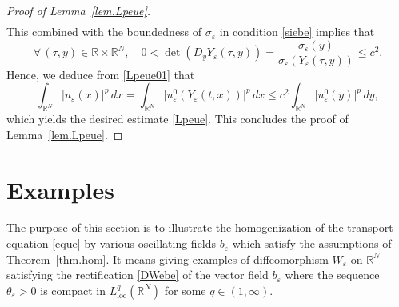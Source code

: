 \documentclass[11pt]{article}
\newcommand{\loc}{\mathrm{loc}}
\def \RR {\mathbb R}
\theoremstyle{plain}
\theoremstyle{definition}
\numberwithin{equation}{section}
\begin{document}
\begin{proof}[Proof of Lemma~\ref{lem.Lpeue}]
\begin{multline*}
\end{multline*}
This combined with the boundedness of $\sigma_\varepsilon$ in condition \eqref{siebe} implies that
\[
\forall\,(\tau,y)\in\RR\times\RR^N,\quad 0<\det(D_y Y_\varepsilon(\tau,y))= \dfrac{\sigma_\varepsilon(y)}{\sigma_\varepsilon(Y_\varepsilon(\tau,y))}\leq c^2.
\]
Hence, we deduce from \eqref{Lpeue01} that
\[
\int_{\RR^N}|u_\varepsilon(x)|^p\,dx=\int_{\RR^N}\big|u_\varepsilon^0(Y_\varepsilon(t,x))\big|^p\,dx\leq c^2\int_{\RR^N}\big|u_\varepsilon^0(y)\big|^p\,dy,
\]
which yields the desired estimate \eqref{Lpeue}. This concludes the proof of Lemma~\ref{lem.Lpeue}.
\end{proof}


\section{Examples}\label{s.exa}
The purpose of this section is to illustrate the homogenization of the transport equation \eqref{eque} by various oscillating fields $b_\varepsilon$ which satisfy the assumptions of Theorem~\ref{thm.hom}. It means giving examples of diffeomorphism $W_\varepsilon$ on $\RR^N$ satisfying the rectification \eqref{DWebe} of the vector field $b_\varepsilon$ where the sequence $\theta_\varepsilon>0$ is compact in $L^q_\loc(\RR^N)$ for some $q\in(1,\infty)$.
\end{document}
